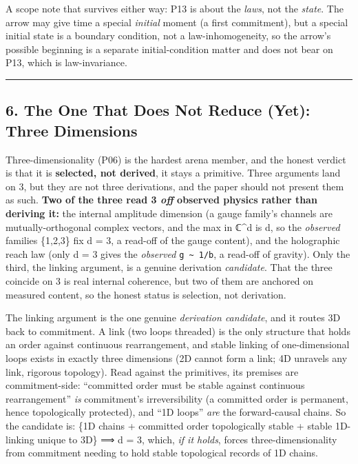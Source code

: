 \documentclass[
  11pt,
]{article}
\begin{document}
A scope note that survives either way: P13 is about the \emph{laws}, not
the \emph{state}. The arrow may give time a special \emph{initial}
moment (a first commitment), but a special initial state is a boundary
condition, not a law-inhomogeneity, so the arrow's possible beginning is
a separate initial-condition matter and does not bear on P13, which is
law-invariance.

\begin{center}\rule{0.5\linewidth}{0.5pt}\end{center}

\subsection{6. The One That Does Not Reduce (Yet): Three
Dimensions}\label{the-one-that-does-not-reduce-yet-three-dimensions}

Three-dimensionality (P06) is the hardest arena member, and the honest
verdict is that it is \textbf{selected, not derived}, it stays a
primitive. Three arguments land on 3, but they are not three
derivations, and the paper should not present them as such. \textbf{Two
of the three read 3 \emph{off} observed physics rather than deriving
it:} the internal amplitude dimension (a gauge family's channels are
mutually-orthogonal complex vectors, and the max in ℂ\^{}d is d, so the
\emph{observed} families \{1,2,3\} fix d = 3, a read-off of the gauge
content), and the holographic reach law (only d = 3 gives the
\emph{observed} \texttt{g\ \textasciitilde{}\ 1/b}, a read-off of
gravity). Only the third, the linking argument, is a genuine derivation
\emph{candidate}. That the three coincide on 3 is real internal
coherence, but two of them are anchored on measured content, so the
honest status is selection, not derivation.

The linking argument is the one genuine \emph{derivation candidate}, and
it routes 3D back to commitment. A link (two loops threaded) is the only
structure that holds an order against continuous rearrangement, and
stable linking of one-dimensional loops exists in exactly three
dimensions (2D cannot form a link; 4D unravels any link, rigorous
topology). Read against the primitives, its premises are
commitment-side: ``committed order must be stable against continuous
rearrangement'' \emph{is} commitment's irreversibility (a committed
order is permanent, hence topologically protected), and ``1D loops''
\emph{are} the forward-causal chains. So the candidate is: \{1D chains +
committed order topologically stable + stable 1D-linking unique to 3D\}
⟹ d = 3, which, \emph{if it holds}, forces three-dimensionality from
commitment needing to hold stable topological records of 1D chains.
\end{document}
